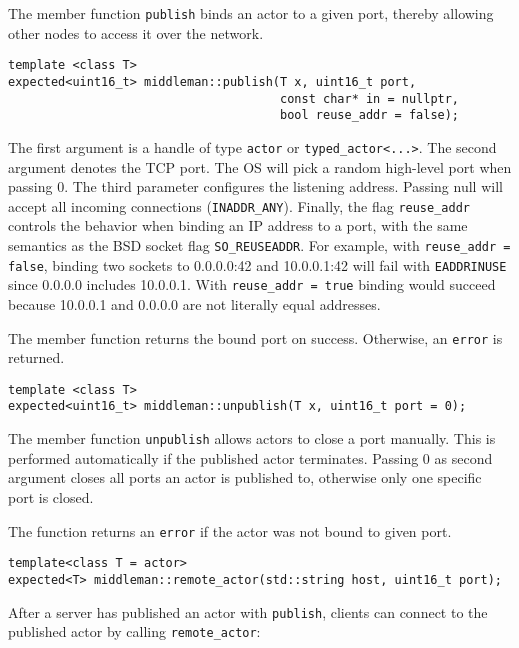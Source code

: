 The member function \lstinline^publish^ binds an actor to a given port, thereby allowing other nodes to access it over the network.

\begin{lstlisting}
template <class T>
expected<uint16_t> middleman::publish(T x, uint16_t port,
                                      const char* in = nullptr,
                                      bool reuse_addr = false);
\end{lstlisting}

The first argument is a handle of type \lstinline^actor^ or \lstinline^typed_actor<...>^. The second argument denotes the TCP port. The OS will pick a random high-level port when passing 0. The third parameter configures the listening address. Passing null will accept all incoming connections (\lstinline^INADDR_ANY^). Finally, the flag \lstinline^reuse_addr^ controls the behavior when binding an IP address to a port, with the same semantics as the BSD socket flag \lstinline^SO_REUSEADDR^.
For example, with \lstinline^reuse_addr = false^, binding two sockets to 0.0.0.0:42 and 10.0.0.1:42 will fail with \texttt{EADDRINUSE} since 0.0.0.0 includes 10.0.0.1. 
With \lstinline^reuse_addr = true^ binding would succeed because 10.0.0.1 and
0.0.0.0 are not literally equal addresses.

The member function returns the bound port on success. Otherwise, an \lstinline^error^  is returned.

\begin{lstlisting}
template <class T>
expected<uint16_t> middleman::unpublish(T x, uint16_t port = 0);
\end{lstlisting}

The member function \lstinline^unpublish^ allows actors to close a port manually. This is performed automatically if the published actor terminates. Passing 0 as second argument closes all ports an actor is published to, otherwise only one specific port is closed.

The function returns an \lstinline^error^  if the actor was not bound to given port.

\clearpage
\begin{lstlisting}
template<class T = actor>
expected<T> middleman::remote_actor(std::string host, uint16_t port);
\end{lstlisting}

After a server has published an actor with \lstinline^publish^, clients can connect to the published actor by calling \lstinline^remote_actor^:

